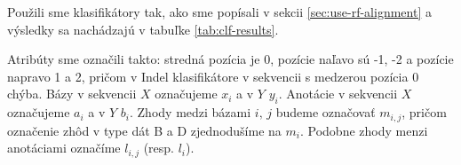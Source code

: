 
Použili sme klasifikátory tak, ako sme popísali v sekcii \ref{sec:use-rf-alignment} a výsledky sa nachádzajú v tabuľke \ref{tab:clf-results}.

Atribúty sme označili takto: stredná pozícia je 0, pozície naľavo sú -1, -2 a pozície napravo 1 a 2, pričom v Indel klasifikátore v sekvencii s medzerou pozícia 0 chýba. Bázy v sekvencii $X$ označujeme $x_i$ a v $Y$ $y_i$. Anotácie v sekvencii $X$ označujeme $a_i$ a v $Y$ $b_i$. Zhody medzi bázami $i,\, j$ budeme označovať $m_{i, j}$, pričom označenie zhôd v type dát B a D zjednodušíme na $m_i$. Podobne zhody menzi anotáciami označíme $l_{i, j}$ (resp. $l_i$).

